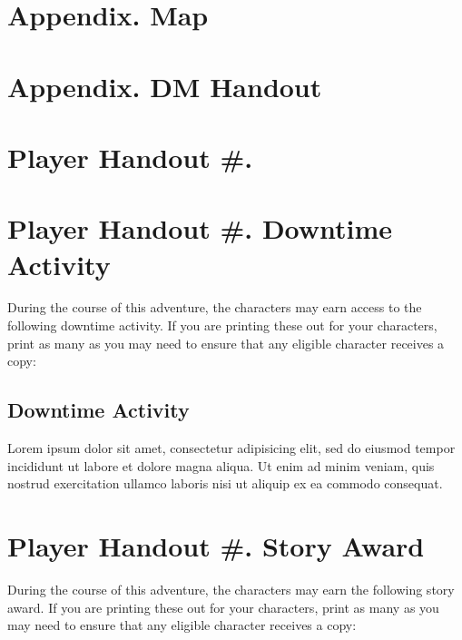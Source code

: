 \section{\texorpdfstring{Appendix. Map\\
}{Appendix. Map }}\label{appendix.-map}

\section{\texorpdfstring{Appendix. DM Handout\\
}{Appendix. DM Handout }}\label{appendix.-dm-handout}

\section{\texorpdfstring{Player Handout \#.\\
}{Player Handout \#. }}\label{player-handout-.}

\section{Player Handout \#. Downtime
Activity}\label{player-handout-.-downtime-activity}

During the course of this adventure, the characters may earn access to
the following downtime activity. If you are printing these out for your
characters, print as many as you may need to ensure that any eligible
character receives a copy:

\subsection{Downtime Activity}\label{downtime-activity}

Lorem ipsum dolor sit amet, consectetur adipisicing elit, sed do eiusmod
tempor incididunt ut labore et dolore magna aliqua. Ut enim ad minim
veniam, quis nostrud exercitation ullamco laboris nisi ut aliquip ex ea
commodo consequat.

\section{Player Handout \#. Story
Award}\label{player-handout-.-story-award}

During the course of this adventure, the characters may earn the
following story award. If you are printing these out for your
characters, print as many as you may need to ensure that any eligible
character receives a copy:

